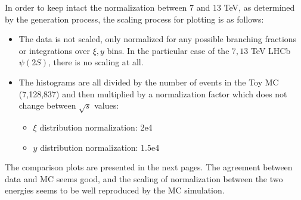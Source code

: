\documentclass{article}
\begin{document}
In order to keep intact the normalization between $7$ and $13$ TeV, as determined by the generation process, the scaling process for plotting is as follows:
\begin{itemize}
\item The data is not scaled, only normalized for any possible branching fractions or integrations over $\xi,y$ bins. In the particular case of the $7,13$ TeV LHCb $\psi(2S)$, there is no scaling at all.
\item The histograms are all divided by the number of events in the Toy MC (7,128,837) and then multiplied by a normalization factor which does not change between $\sqrt{s}$ values: 
\begin{itemize}
\item $\xi$ distribution normalization: 2e4
\item $y$ distribution normalization: 1.5e4
\end{itemize}
\end{itemize}

The comparison plots are presented in the next pages. The agreement between data and MC seems good, and the scaling of normalization between the two energies seems to be well reproduced by the MC simulation.

\clearpage

\end{document}
